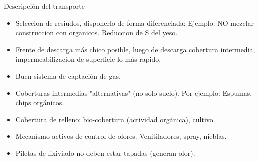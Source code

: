 \begin{frame}{Descripción del transporte}

\begin{itemize}
   \item Seleccion de resiudos, disponerlo de forma diferenciada: Ejemplo: NO mezclar construccion con organicos. Reduccion de S del yeso.
   \item Frente de descarga más chico posible, luego de descarga cobertura intermedia, impermeabilizacion de superficie lo más rapido. 
   \item Buen sistema de captación de gas.
   \item Coberturas intermedias "alternativas" (no solo suelo). Por ejemplo: Espumas, chips orgánicos.
   \item Cobertura de relleno: bio-cobertura (actividad orgánica), cultivo.
   \item Mecanísmo activos de control de olores. Venitiladores, spray, nieblas.
   \item Piletas de lixiviado no deben estar tapadas (generan olor).
\end{itemize}

    
\end{frame}


